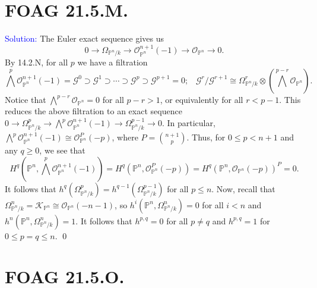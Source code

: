 \documentclass[11pt]{article}
\newcommand{\PP}{\mathbb{P}}
\newcommand{\cG}{\mathcal{G}}
\newcommand{\cK}{\mathcal{K}}
\newcommand{\cO}{\mathcal{O}}
\newenvironment{solution}{\begin{trivlist}\item[]{\textcolor{blue}{Solution:}}}{\qed \end{trivlist}}
\begin{document}
\newpage

\section*{FOAG 21.5.M.}

\begin{solution}
    The Euler exact sequence gives us 
    \[
        0 \longrightarrow \Omega_{\PP^n/k} \longrightarrow \cO_{\PP^n}^{n+1}(-1) \longrightarrow \cO_{\PP^n} \longrightarrow 0.
    \]
    By 14.2.N, for all $p$ we have a filtration 
    \[
        \bigwedge^p \cO_{\PP^n}^{n+1}(-1) = \cG^0 \supset \cG^1 \supset \cdots \supset \cG^p \supset \cG^{p+1} = 0 ; 
        \hspace{10pt} 
        \cG^r / \cG^{r+1} \cong \Omega^r_{\PP^n/k} \otimes \left( \bigwedge^{p-r} \cO_{\PP^n} \right).
    \]
    Notice that $\bigwedge^{p-r} \cO_{\PP^n} = 0$ for all $p-r > 1$, or equivalently for all $r < p - 1$. This reduces the above filtration to an exact sequence $0 \rightarrow \Omega^{p}_{\PP^n/k} \rightarrow \bigwedge^p \cO_{\PP^n}^{n+1}(-1) \rightarrow \Omega^{p-1}_{\PP^n/k} \rightarrow 0$. In particular, $\bigwedge^p \cO_{\PP^n}^{n+1}(-1) \cong \cO_{\PP^n}^P(-p)$, where $P = \binom{n+1}{p}$. Thus, for $0 \leq p < n+1$ and any $q \geq 0$, we see that 
    \[
        H^q \left( \PP^n, \bigwedge^p \cO_{\PP^n}^{n+1}(-1) \right)
        = H^q (\PP^n, \cO_{\PP^n}^{P}(-p))
        = H^q (\PP^n, \cO_{\PP^n}(-p))^{P}
        = 0.
    \]
    It follows that $h^q(\Omega_{\PP^n/k}^p) = h^{q-1} (\Omega_{\PP^n/k}^{p-1})$ for all $p \leq n$. Now, recall that $\Omega_{\PP^n/k}^n = \cK_{\PP^n} \cong \cO_{\PP^n}(-n-1)$, so $h^i(\PP^n, \Omega_{\PP^n/k}^n) = 0$ for all $i < n$ and $h^n(\PP^n, \Omega_{\PP^n/k}^n) = 1$. It follows that $h^{p,q} = 0$ for all $p \neq q$ and $h^{p,q} = 1$ for $0 \leq p = q \leq n$. 
\end{solution}

\newpage

\section*{FOAG 21.5.O.}
\end{document}
